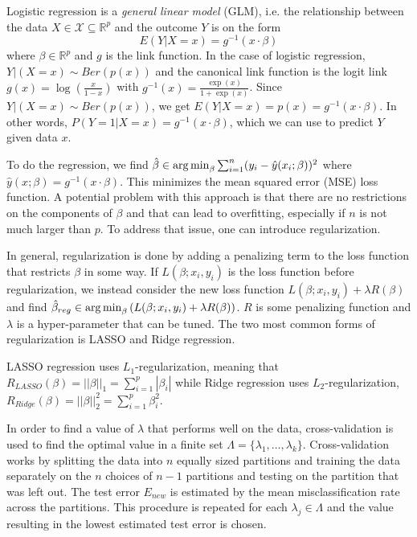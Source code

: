 \documentclass[../../project.tex]{subfiles}
\begin{document}
	Logistic regression is a \textit{general linear model} (GLM), i.e. the relationship between the data $X \in \mathcal{X} \subseteq \mathbb{R}^p$ and the outcome $Y$ is on the form
	\begin{equation}
	E(Y|X=x) = g^{-1}(x \cdot \beta)
	\end{equation}
	where $\beta \in \mathbb{R}^p$ and $g$ is the link function. In the case of logistic regression, $Y|(X = x) \sim Ber(p(x))$ and the canonical link function is the logit link $g(x) = \log \left( \frac{x}{1 - x} \right)$ with $g^{-1}(x) = \frac{\exp(x)}{1 + \exp(x)}$. Since $Y|(X=x) \sim Ber(p(x))$, we get $E(Y|X=x) = p(x) = g^{-1}(x \cdot \beta)$. In other words, $P(Y = 1 | X = x) = g^{-1}(x \cdot \beta)$, which we can use to predict $Y$ given data $x$.
	
	To do the regression, we find $\hat \beta \in \operatorname*{arg\,min}_\beta \sum_{i=1}^{n} (y_i - \hat y(x_i; \beta))^2$ where $\hat y(x;\beta) = g^{-1} (x \cdot \beta)$. This minimizes the mean squared error (MSE) loss function. A potential problem with this approach is that there are no restrictions on the components of $\beta$ and that can lead to overfitting, especially if $n$ is not much larger than $p$. To address that issue, one can introduce regularization.
	
	In general, regularization is done by adding a penalizing term to the loss function that restricts $\beta$ in some way. If $L(\beta; x_i,y_i)$ is the loss function before regularization, we instead consider the new loss function $L(\beta; x_i,y_i) + \lambda R(\beta)$ and find $\hat \beta_{reg} \in \operatorname*{arg\,min}_\beta \left( L(\beta; x_i, y_i) + \lambda R(\beta) \right)$. $R$ is some penalizing function and $\lambda$ is a hyper-parameter that can be tuned. The two most common forms of regularization is LASSO and Ridge regression.
	
	LASSO regression uses $L_1$-regularization, meaning that $R_{LASSO}(\beta) = ||\beta||_1 =  \sum_{i=1}^{p} |\beta_i|$ while Ridge regression uses $L_2$-regularization, $R_{Ridge}(\beta) = ||\beta||_2^2 = \sum_{i=1}^{p} \beta_i^2$.
	
	In order to find a value of $\lambda$ that performs well on the data, cross-validation is used to find the optimal value in a finite set $\Lambda = \{ \lambda_1,\dots,\lambda_k \}$. Cross-validation works by splitting the data into $n$ equally sized partitions and training the data separately on the $n$ choices of $n-1$ partitions and testing on the partition that was left out. The test error $E_{new}$ is estimated by the mean misclassification rate across the partitions. This procedure is repeated for each $\lambda_j \in \Lambda$ and the value resulting in the lowest estimated test error is chosen.
	
\end{document}
